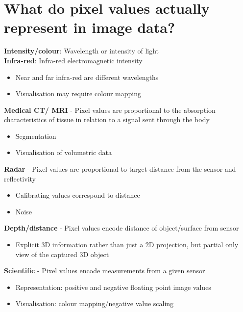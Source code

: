\documentclass{article}[18pt]
\begin{document}
\section{What do pixel values actually represent in image data?}
\textbf{Intensity/colour}: Wavelength or intensity of light\\
\textbf{Infra-red}: Infra-red electromagnetic intensity
\begin{itemize}
	\item Near and far infra-red are different wavelengths
	\item Visualisation may require colour mapping
\end{itemize}
\textbf{Medical CT/ MRI} - Pixel values are proportional to the absorption characteristics of tissue in relation to a signal sent through the body
\begin{itemize}
	\item Segmentation
	\item Visualisation of volumetric data
\end{itemize}
\textbf{Radar} - Pixel values are proportional to target distance from the sensor and reflectivity
\begin{itemize}
	\item Calibrating values correspond to distance
	\item Noise
\end{itemize}
\textbf{Depth/distance} - Pixel values encode distance of object/surface from sensor
\begin{itemize}
	\item Explicit 3D information rather than just a 2D projection, but partial only view of the captured 3D object
\end{itemize}
\textbf{Scientific} - Pixel values encode measurements from a given sensor
\begin{itemize}
	\item Representation: positive and negative floating point image values
	\item Visualisation: colour mapping/negative value scaling
\end{itemize}
\end{document}
